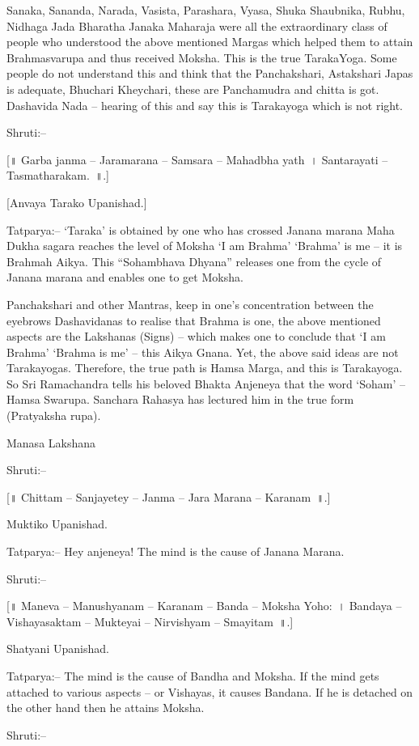 Sanaka, Sananda, Narada, Vasista, Parashara, Vyasa, Shuka Shaubnika, Rubhu, Nidhaga Jada Bharatha Janaka Maharaja were all the extraordinary class of people who understood the above mentioned Margas which helped them to attain Brahmasvarupa and thus received Moksha. This is the true TarakaYoga. Some people do not understand this and think that the Panchakshari, Astakshari Japas is adequate, Bhuchari Kheychari, these are Panchamudra and chitta is got. Dashavida Nada – hearing of this and say this is Tarakayoga which is not right.

Shruti:–

[॥ Garba janma – Jaramarana – Samsara – Mahadbha yath~। Santarayati – Tasmatharakam.~॥.]

[Anvaya Tarako Upanishad.]

Tatparya:– ‘Taraka’ is obtained by one who has crossed Janana marana Maha Dukha sagara reaches the level of Moksha ‘I am Brahma’ ‘Brahma’ is me – it is Brahmah Aikya. This “Sohambhava Dhyana” releases one from the cycle of Janana marana and enables one to get Moksha.

Panchakshari and other Mantras, keep in one's concentration between the eyebrows Dashavidanas to realise that Brahma is one, the above mentioned aspects are the Lakshanas (Signs) – which makes one to conclude that ‘I am Brahma’ ‘Brahma is me’ – this Aikya Gnana. Yet, the above said ideas are not Tarakayogas. Therefore, the true path is Hamsa Marga, and this is Tarakayoga. So Sri Ramachandra tells his beloved Bhakta Anjeneya that the word ‘Soham’ – Hamsa Swarupa. Sanchara Rahasya has lectured him in the true form (Pratyaksha rupa).

Manasa Lakshana

Shruti:–

[॥ Chittam – Sanjayetey – Janma – Jara Marana – Karanam~॥.]

Muktiko Upanishad.

Tatparya:– Hey anjeneya! The mind is the cause of Janana Marana.

Shruti:–

[॥ Maneva – Manushyanam – Karanam – Banda – Moksha Yoho:~। Bandaya – Vishayasaktam – Mukteyai – Nirvishyam – Smayitam~॥.]

Shatyani Upanishad.

Tatparya:– The mind is the cause of Bandha and Moksha. If the mind gets attached to various aspects – or Vishayas, it causes Bandana. If he is detached on the other hand then he attains Moksha.

Shruti:–

